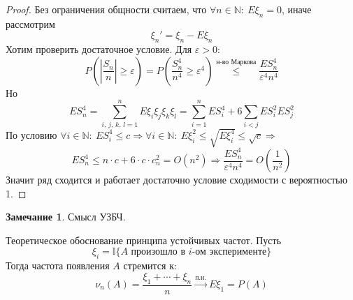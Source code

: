 \documentclass[a4paper,12pt]{article}
\renewcommand{\leq}{\ensuremath{\leqslant}}
\renewcommand{\geq}{\ensuremath{\geqslant}}
\theoremstyle{plain}
\theoremstyle{definition}
\newtheorem*{note}{Замечание}
\theoremstyle{remark}
\begin{document}
\begin{proof}
  Без ограничения общности считаем, что $\forall n \in \mathbb{N}:\: E\xi_n = 0$, иначе рассмотрим
  \[\xi_n' = \xi_n - E\xi_n\]
  Хотим проверить достаточное условие. Для $\varepsilon > 0$:
  \[P\left(\left|\frac{S_n}{n}\right| \geq \varepsilon\right) = P\left(\frac{S_n^4}{n^4} \geq \varepsilon ^4\right) \stackrel{\text{н-во Маркова}}{\leq} \frac{ES_n^4}{\varepsilon^4n^4}\]
  Но 
  \[ES_n^4 = \sum_{i,\,j,\,k,\,l = 1}^n E\xi_i\xi_j\xi_k\xi_l = \sum_{i = 1}^n ES_i^4 + 6\sum_{i < j}ES_i^2ES_j^2\]
  По условию $\forall i \in \mathbb{N}:\: ES_i^4 \leq c \Rightarrow \forall i \in \mathbb{N}:\: E\xi_i^2 \leq \sqrt{E\xi_i^4} \leq \sqrt{c} \Rightarrow$
  \[ES_n^4 \leq n\cdot c + 6\cdot c\cdot c_n^2 = O(n^2) \Rightarrow \frac{ES_n^4}{\varepsilon^4n^4} = O\left(\frac{1}{n^2}\right)\]
  Значит ряд сходится и работает достаточно условие сходимости с вероятностью 1.
\end{proof}

\begin{note}
  Смысл УЗБЧ.

  Теоретическое обоснование принципа устойчивых частот. Пусть 
  \[\xi_i = \mathbb{I}\{A \text{ произошло в }i \text{-ом эксперименте}\}\]
  Тогда частота появления $A$ стремится к:
  \[\nu_n(A) = \frac{\xi_1 + \cdots + \xi_n}{n} \stackrel{\text{п.н.}}{\to} E\xi_1 = P(A)\]
\end{note}
\end{document}
